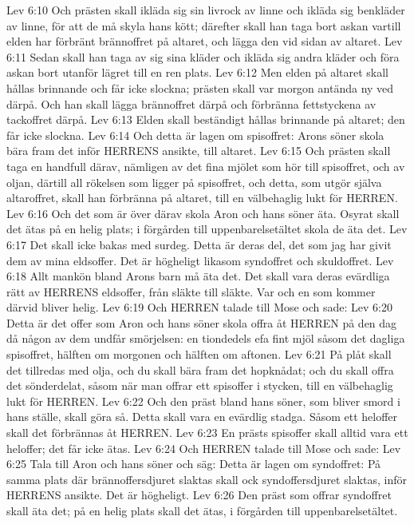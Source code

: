Lev 6:10  Och prästen skall ikläda sig sin livrock av linne och ikläda sig benkläder av linne, för att de må skyla hans kött; därefter skall han taga bort askan vartill elden har förbränt brännoffret på altaret, och lägga den vid sidan av altaret.
Lev 6:11  Sedan skall han taga av sig sina kläder och ikläda sig andra kläder och föra askan bort utanför lägret till en ren plats.
Lev 6:12  Men elden på altaret skall hållas brinnande och får icke slockna; prästen skall var morgon antända ny ved därpå. Och han skall lägga brännoffret därpå och förbränna fettstyckena av tackoffret därpå.
Lev 6:13  Elden skall beständigt hållas brinnande på altaret; den får icke slockna.
Lev 6:14  Och detta är lagen om spisoffret: Arons söner skola bära fram det inför HERRENS ansikte, till altaret.
Lev 6:15  Och prästen skall taga en handfull därav, nämligen av det fina mjölet som hör till spisoffret, och av oljan, därtill all rökelsen som ligger på spisoffret, och detta, som utgör själva altaroffret, skall han förbränna på altaret, till en välbehaglig lukt för HERREN.
Lev 6:16  Och det som är över därav skola Aron och hans söner äta. Osyrat skall det ätas på en helig plats; i förgården till uppenbarelsetältet skola de äta det.
Lev 6:17  Det skall icke bakas med surdeg. Detta är deras del, det som jag har givit dem av mina eldsoffer. Det är högheligt likasom syndoffret och skuldoffret.
Lev 6:18  Allt mankön bland Arons barn må äta det. Det skall vara deras evärdliga rätt av HERRENS eldsoffer, från släkte till släkte. Var och en som kommer därvid bliver helig.
Lev 6:19  Och HERREN talade till Mose och sade:
Lev 6:20  Detta är det offer som Aron och hans söner skola offra åt HERREN på den dag då någon av dem undfår smörjelsen: en tiondedels efa fint mjöl såsom det dagliga spisoffret, hälften om morgonen och hälften om aftonen.
Lev 6:21  På plåt skall det tillredas med olja, och du skall bära fram det hopknådat; och du skall offra det sönderdelat, såsom när man offrar ett spisoffer i stycken, till en välbehaglig lukt för HERREN.
Lev 6:22  Och den präst bland hans söner, som bliver smord i hans ställe, skall göra så. Detta skall vara en evärdlig stadga. Såsom ett heloffer skall det förbrännas åt HERREN.
Lev 6:23  En prästs spisoffer skall alltid vara ett heloffer; det får icke ätas.
Lev 6:24  Och HERREN talade till Mose och sade:
Lev 6:25  Tala till Aron och hans söner och säg: Detta är lagen om syndoffret: På samma plats där brännoffersdjuret slaktas skall ock syndoffersdjuret slaktas, inför HERRENS ansikte. Det är högheligt.
Lev 6:26  Den präst som offrar syndoffret skall äta det; på en helig plats skall det ätas, i förgården till uppenbarelsetältet.
